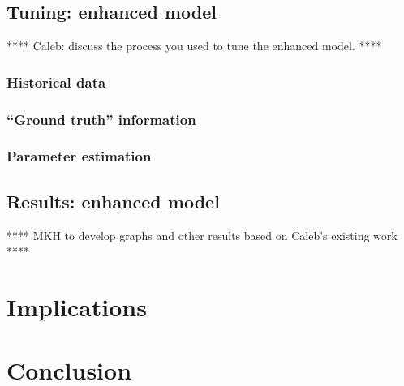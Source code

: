 \documentclass[letterpaper,12pt]{article}
\begin{document}
\subsection{Tuning: enhanced model}
\label{sec:enhanced_model_tuning}

**** Caleb: discuss the process you used to tune the enhanced model. ****

\subsubsection{Historical data}
\label{sec:enhanced_model_historical_data}

\subsubsection{``Ground truth'' information}
\label{sec:enhanced_model_ground_truth}

\subsubsection{Parameter estimation}
\label{sec:enhanced_model_parameter_estimation}


\subsection{Results: enhanced model}
\label{sec:enhanced_model_results}

**** MKH to develop graphs and other results based on Caleb's existing work ****


\section{Implications}
\label{sec:Implications}


\section{Conclusion}
\label{sec:Conclustion}


\end{document}
